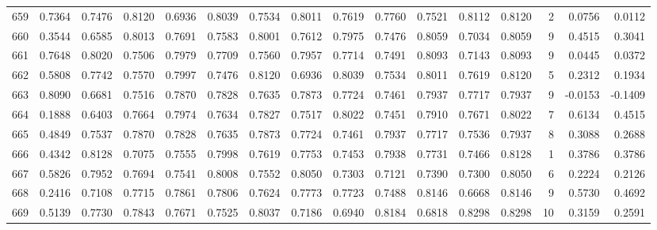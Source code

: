 \begin{tabular}{lrrrrrrrrrrrrrrr}
659 &      0.7364 &  0.7476 &  0.8120 &  0.6936 &  0.8039 &  0.7534 &  0.8011 &  0.7619 &  0.7760 &  0.7521 &   0.8112 &     0.8120 &      2 &                    0.0756 &                     0.0112 \\
660 &      0.3544 &  0.6585 &  0.8013 &  0.7691 &  0.7583 &  0.8001 &  0.7612 &  0.7975 &  0.7476 &  0.8059 &   0.7034 &     0.8059 &      9 &                    0.4515 &                     0.3041 \\
661 &      0.7648 &  0.8020 &  0.7506 &  0.7979 &  0.7709 &  0.7560 &  0.7957 &  0.7714 &  0.7491 &  0.8093 &   0.7143 &     0.8093 &      9 &                    0.0445 &                     0.0372 \\
662 &      0.5808 &  0.7742 &  0.7570 &  0.7997 &  0.7476 &  0.8120 &  0.6936 &  0.8039 &  0.7534 &  0.8011 &   0.7619 &     0.8120 &      5 &                    0.2312 &                     0.1934 \\
663 &      0.8090 &  0.6681 &  0.7516 &  0.7870 &  0.7828 &  0.7635 &  0.7873 &  0.7724 &  0.7461 &  0.7937 &   0.7717 &     0.7937 &      9 &                   -0.0153 &                    -0.1409 \\
664 &      0.1888 &  0.6403 &  0.7664 &  0.7974 &  0.7634 &  0.7827 &  0.7517 &  0.8022 &  0.7451 &  0.7910 &   0.7671 &     0.8022 &      7 &                    0.6134 &                     0.4515 \\
665 &      0.4849 &  0.7537 &  0.7870 &  0.7828 &  0.7635 &  0.7873 &  0.7724 &  0.7461 &  0.7937 &  0.7717 &   0.7536 &     0.7937 &      8 &                    0.3088 &                     0.2688 \\
666 &      0.4342 &  0.8128 &  0.7075 &  0.7555 &  0.7998 &  0.7619 &  0.7753 &  0.7453 &  0.7938 &  0.7731 &   0.7466 &     0.8128 &      1 &                    0.3786 &                     0.3786 \\
667 &      0.5826 &  0.7952 &  0.7694 &  0.7541 &  0.8008 &  0.7552 &  0.8050 &  0.7303 &  0.7121 &  0.7390 &   0.7300 &     0.8050 &      6 &                    0.2224 &                     0.2126 \\
668 &      0.2416 &  0.7108 &  0.7715 &  0.7861 &  0.7806 &  0.7624 &  0.7773 &  0.7723 &  0.7488 &  0.8146 &   0.6668 &     0.8146 &      9 &                    0.5730 &                     0.4692 \\
669 &      0.5139 &  0.7730 &  0.7843 &  0.7671 &  0.7525 &  0.8037 &  0.7186 &  0.6940 &  0.8184 &  0.6818 &   0.8298 &     0.8298 &     10 &                    0.3159 &                     0.2591 \\

\end{tabular}
